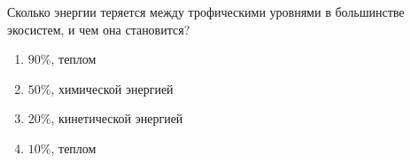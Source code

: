 
Сколько
энергии теряется между трофическими уровнями в большинстве экосистем, и чем она
становится?

\begin{enumerate}
    \item $90\%$, теплом
    \item $50\%$, химической энергией
    \item $20\%$, кинетической энергией
    \item $10\%$, теплом
\end{enumerate}

